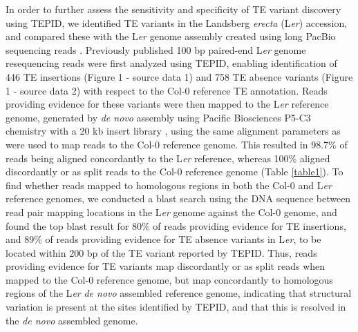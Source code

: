 \documentclass[12pt]{article}
\begin{document}
In order to further assess the sensitivity and specificity of TE
variant discovery using TEPID, we identified TE variants in the
Landsberg \emph{erecta} (L\emph{er}) accession, and compared these
with the L\emph{er }genome assembly created using long PacBio
sequencing reads \cite{Chin:2013iw}. Previously published 100 bp
paired-end L\emph{er} genome resequencing reads
\cite{Schneeberger:2011ft} were first analyzed using TEPID, enabling
identification of 446 TE insertions (Figure 1 - source data 1) and 758
TE absence variants (Figure 1 - source data 2) with respect to the
Col-0 reference TE annotation. Reads providing evidence for these
variants were then mapped to the L\emph{er} reference genome,
generated by \emph{de novo} assembly using Pacific Biosciences P5-C3
chemistry with a 20 kb insert library \cite{Chin:2013iw}, using the
same alignment parameters as were used to map reads to the Col-0
reference genome. This resulted in 98.7\% of reads being aligned
concordantly to the L\emph{er} reference, whereas 100\% aligned
discordantly or as split reads to the Col-0 reference genome (Table
\ref{table1}). To find whether reads mapped to homologous regions in both the
Col-0 and L\emph{er} reference genomes, we conducted a blast search
\cite{Camacho:2009fc} using the DNA sequence between read pair mapping
locations in the L\emph{er} genome against the Col-0 genome, and found
the top blast result for 80\% of reads providing evidence for TE
insertions, and 89\% of reads providing evidence for TE absence
variants in L\emph{er}, to be located within 200 bp of the TE variant
reported by TEPID. Thus, reads providing evidence for TE variants map
discordantly or as split reads when mapped to the Col-0 reference
genome, but map concordantly to homologous regions of the L\emph{er}
\emph{de novo} assembled reference genome, indicating that structural
variation is present at the sites identified by TEPID, and that this
is resolved in the \emph{de novo} assembled genome.
\end{document}
